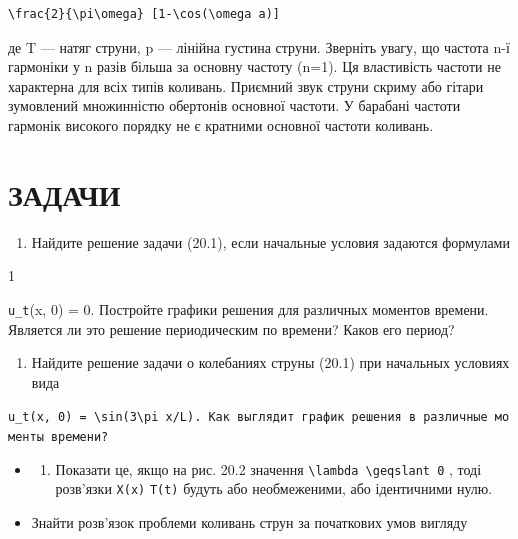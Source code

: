 \documentclass[
  ukrainian,
]{article}
\providecommand{\tightlist}{%
  \setlength{\itemsep}{0pt}\setlength{\parskip}{0pt}}
\begin{document}
\begin{verbatim}
\frac{2}{\pi\omega} [1-\cos(\omega a)]
\end{verbatim}

де T --- натяг струни, p --- лінійна густина струни. Зверніть увагу, що
частота n-ї гармоніки у n разів більша за основну частоту (n=1). Ця
властивість частоти не характерна для всіх типів коливань. Приємний звук
струни скриму або гітари зумовлений множинністю обертонів основної
частоти. У барабані частоти гармонік високого порядку не є кратними
основної частоти коливань.

\section{ЗАДАЧИ}\label{ux437ux430ux434ux430ux447ux438}

\begin{enumerate}
\def\labelenumi{\arabic{enumi}.}
\tightlist
\item
  Найдите решение задачи (20.1), если начальные условия задаются
  формулами
\end{enumerate}

1

\texttt{u\_t}(x, 0) = 0. Постройте графики решения для различных
моментов времени. Является ли это решение периодическим по времени?
Каков его период?

\begin{enumerate}
\def\labelenumi{\arabic{enumi}.}
\setcounter{enumi}{1}
\tightlist
\item
  Найдите решение задачи о колебаниях струны (20.1) при начальных
  условиях вида
\end{enumerate}

\texttt{\textquotesingle{}u\_t(x,\ 0)\ =\ \textbackslash{}sin(3\textbackslash{}pi\ x/L).\textquotesingle{}\ Как\ выглядит\ график\ решения\ в\ различные\ моменты\ времени?}

\begin{itemize}
\tightlist
\item
  \begin{enumerate}
  \def\labelenumi{\arabic{enumi}.}
  \setcounter{enumi}{2}
  \tightlist
  \item
    Показати це, якщо на рис. 20.2 значення
    \texttt{\textbackslash{}lambda\ \textbackslash{}geqslant\ 0} , тоді
    розв'язки \texttt{X(x)} \texttt{T(t)} будуть або необмеженими, або
    ідентичними нулю.
  \end{enumerate}
\item
  Знайти розв'язок проблеми коливань струн за початкових умов вигляду
\end{itemize}
\end{document}
